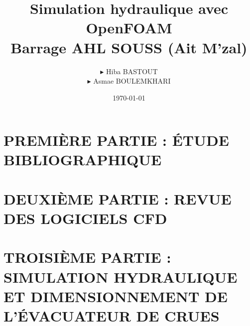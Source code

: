 \documentclass[12pt,a4paper]{rapportECL}
\title{Simulation hydraulique avec OpenFOAM\\Barrage AHL SOUSS (Ait M'zal)}
\author{
    \hspace{0.5cm}$\blacktriangleright$ Hiba BASTOUT\\[0.1cm]
    \hspace{0.5cm}$\blacktriangleright$ Asmae BOULEMKHARI\\[0.1cm]
}
\date{\today}
\begin{document}
\hypersetup{pageanchor=false}
\maketitle
\thispagestyle{empty}
\hypersetup{pageanchor=true}



\newpage
\thispagestyle{empty}
\mbox{}
\newpage

\setcounter{page}{1}





\tableofcontents

\newpage
\renewcommand{\listfigurename}{\textbf{Liste des figures}}
\listoffigures
\newpage

\renewcommand{\listtablename}{\textbf{Liste des tableaux}}
\listoftables
\newpage



\setcounter{page}{1}



\part{PREMIÈRE PARTIE : ÉTUDE BIBLIOGRAPHIQUE}






\part{DEUXIÈME PARTIE : REVUE DES LOGICIELS CFD}



\part{TROISIÈME PARTIE : SIMULATION HYDRAULIQUE ET DIMENSIONNEMENT DE L'ÉVACUATEUR DE CRUES}






\clearpage
\appendix
{}


\clearpage
{}
{}
\printbibliography[heading=none]
\end{document}
